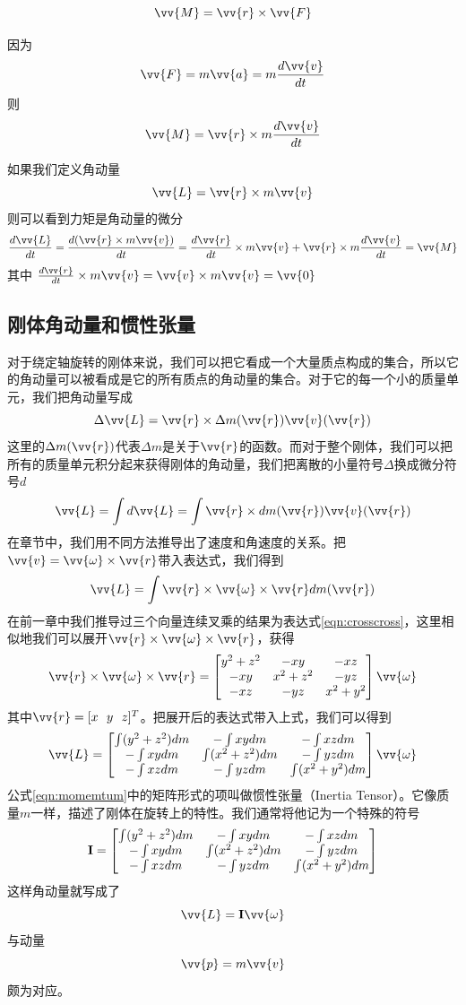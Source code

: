 \documentclass[11pt]{article}
\begin{document}
$$
\vv{M} = \vv{r} \times \vv{F}
$$

因为
$$
\vv{F} = m \vv{a} = m \frac{d\vv{v}}{dt}
$$
则
$$
\vv{M} = \vv{r} \times m \frac{d\vv{v}}{dt}
$$

如果我们定义角动量
$$
\vv{L} = \vv{r} \times m \vv{v}
$$
则可以看到力矩是角动量的微分
$$
\frac{d\vv{L}}{dt} = \frac{d(\vv{r} \times m \vv{v})}{dt} = \frac{d\vv{r}}{dt} \times m \vv{v} + \vv{r}\times m\frac{d\vv{v}}{dt} = \vv{M}
$$
其中
$
\frac{d\vv{r}}{dt} \times m \vv{v} = \vv{v} \times m \vv{v} = \vv{0} 
$
\subsection{刚体角动量和惯性张量}
对于绕定轴旋转的刚体来说，我们可以把它看成一个大量质点构成的集合，所以它的角动量可以被看成是它的所有质点的角动量的集合。对于它的每一个小的质量单元，我们把角动量写成
$$
\Delta \vv{L} = \vv{r} \times \Delta m(\vv{r}) \vv{v}(\vv{r})
$$
这里的$\Delta m(\vv{r})$代表$\Delta m$是关于$\vv{r}$的函数。而对于整个刚体，我们可以把所有的质量单元积分起来获得刚体的角动量，我们把离散的小量符号$\Delta$换成微分符号$d$
$$
\vv{L} = \int d\vv{L} = \int \vv{r} \times dm(\vv{r}) \vv{v}(\vv{r})
$$
在章节\label{sec:angular}中，我们用不同方法推导出了速度和角速度的关系。把$\vv{v} = \vv{\omega}\times\vv{r}$带入表达式，我们得到
\begin{equation}
\vv{L} = \int \vv{r} \times \vv{\omega}\times\vv{r} dm(\vv{r})
\end{equation}
在前一章中我们推导过三个向量连续叉乘的结果为表达式\ref{eqn:crosscross}，这里相似地我们可以展开$\vv{r} \times \vv{\omega}\times\vv{r}$，获得
$$
\vv{r} \times \vv{\omega}\times\vv{r} = 
\begin{bmatrix}
y^2+z^2	&	-xy		&	-xz	\\
-xy		&	x^2+z^2	&	-yz	\\
-xz		&	-yz		&	x^2+y^2
\end{bmatrix}\vv{\omega}
$$
其中$\vv{r} = [x \ \ y \ \ z]^T$。把展开后的表达式带入上式，我们可以得到
\begin{equation}\label{eqn:momemtum}
\vv{L} = 
\begin{bmatrix}
\int (y^2+z^2) dm	&	-\int xy dm		&	-\int xz dm	\\
-\int xy dm		&	\int (x^2+z^2) dm	&	-\int yz dm	\\
-\int xz dm		&	-\int yz dm		&	\int (x^2+y^2) dm
\end{bmatrix}\vv{\omega}
\end{equation}
公式\ref{eqn:momemtum}中的矩阵形式的项叫做惯性张量（Inertia Tensor）。它像质量$m$一样，描述了刚体在旋转上的特性。我们通常将他记为一个特殊的符号
$$
{\bf I} = 
\begin{bmatrix}
\int (y^2+z^2) dm	&	-\int xy dm		&	-\int xz dm	\\
-\int xy dm		&	\int (x^2+z^2) dm	&	-\int yz dm	\\
-\int xz dm		&	-\int yz dm		&	\int (x^2+y^2) dm
\end{bmatrix}
$$
这样角动量就写成了
$$
\vv{L} = {\bf I}\vv{\omega}
$$
与动量
$$
\vv{p} = m\vv{v}
$$
颇为对应。
\end{document}
